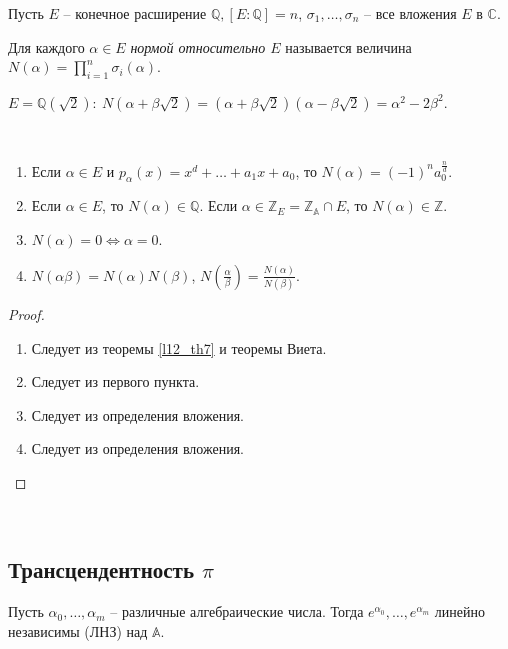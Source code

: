 Пусть $E$ -- конечное расширение $\mathbb{Q}, [E:\mathbb{Q}] = n$, $\sigma_1, \ldots, \sigma_n$ -- все вложения $E$ в $\mathbb{C}$.

\begin{definition}
	Для каждого  $\alpha \in E$ \textit{нормой относительно $E$}  называется величина\\
	$\displaystyle N(\alpha) = \prod_{i= 1}^{n} \sigma_i(\alpha)$.
\end{definition}

\begin{example}
	$E = \mathbb{Q}(\sqrt{2}): \ N(\alpha + \beta\sqrt{2}) = (\alpha + \beta \sqrt{2})(\alpha - \beta \sqrt{2}) = \alpha^2 - 2\beta^2$.
\end{example}

\begin{theorem} \label{l13_th9}~\\
	\begin{enumerate}
		\item Если $\alpha \in E$ и $p_{\alpha}(x) = x^d + \ldots + a_1 x + a_0$, то $N(\alpha) = (-1)^n a_0^{\frac{n}{d}}$.
		\item Если $\alpha \in E$, то $N(\alpha) \in \mathbb{Q}$. Если $\alpha \in \mathbb{Z}_E = \mathbb{Z_\mathbb{A}} \cap E$, то $N(\alpha) \in \mathbb{Z}$.
		\item $N(\alpha) = 0 \Leftrightarrow \alpha = 0$.
		\item $N(\alpha \beta) = N(\alpha) N(\beta)$, $N(\frac{\alpha}{\beta}) = \frac{N(\alpha)}{N(\beta)}$.	
	\end{enumerate}
\end{theorem}
\begin{proof}~\\
	\begin{enumerate}
		\item Следует из теоремы \ref{l12_th7} и теоремы Виета.
		\item Следует из первого пункта.
		\item Следует из определения вложения.
		\item Следует из определения вложения.
	\end{enumerate}
\end{proof}~\\

\subsection{Трансцендентность $\pi$}
\begin{theorem} \label{l13_Lin_Vei}
	Пусть $\alpha_0, \ldots, \alpha_m$ -- различные алгебраические числа. 
	Тогда $e^{\alpha_0}, \ldots, e^{\alpha_m}$ линейно независимы (ЛНЗ) над $\mathbb{A}$.
\end{theorem}

